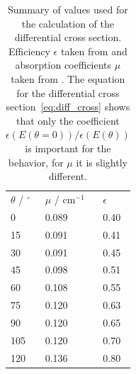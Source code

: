 \begin{table}

\caption{Summary of values used for the calculation of the differential cross
  section. Efficiency $\epsilon$ taken from \cite{fluegge} and absorption coefficients $\mu$
  taken from \cite{ver}. The equation for the differential cross section~\eqref{eq:diff_cross} shows that only the 
  coefficient $\epsilon(E(\theta = 0) ) / \epsilon(E(\theta))$ is important for the behavior, for $\mu$ it is slightly
different. }
  \begin{tabular}{lll}
      \rowcolor{LightCyan}  $\theta$ / $^\circ$ & $\mu$ / $\mathrm{cm}^{-1}$ & $\epsilon$ \\ 
      \cellcolor{LightCyan}  0 &    0.089 & 0.40 \\ 
 \cellcolor{LightCyan}  15 &   0.091 & 0.41  \\
 \cellcolor{LightCyan}  30 &   0.091 & 0.45  \\
 \cellcolor{LightCyan}  45 &   0.098 & 0.51  \\
 \cellcolor{LightCyan}  60 &   0.108 & 0.55  \\
 \cellcolor{LightCyan}  75 &   0.120 & 0.63  \\
 \cellcolor{LightCyan}  90 &   0.120 & 0.65  \\
 \cellcolor{LightCyan}  105 &  0.120 & 0.70  \\
 \cellcolor{LightCyan}  120 &  0.136 & 0.80  
  \end{tabular}
    \label{tab:cross}
\end{table}


